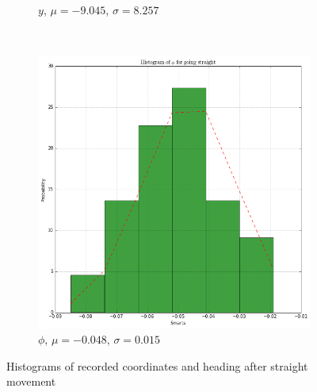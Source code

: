 \documentclass[paper=a4, fontsize=11pt]{scrartcl} %
\begin{document}
\begin{figure}[h!]
\begin{subfigure}[b]{0.3\textwidth}
            \caption{$y$, $\mu = -9.045$, $\sigma = 8.257$}
        \end{subfigure}
        ~
        \begin{subfigure}[b]{0.3\textwidth}
            \setlength{\fboxsep}{0.5pt} %
            \setlength{\fboxrule}{0.5pt}
            \includegraphics[width=\textwidth,fbox]{images/histogram_1_phi_straight.png}
            \caption{$\phi$, $\mu = -0.048$, $\sigma = 0.015$}
        \end{subfigure}
        \caption{Histograms of recorded coordinates and heading after straight movement}
    \end{figure}
    
    \newpage
\end{document}

